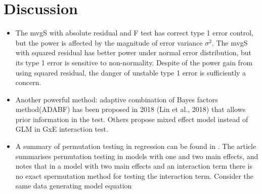 \documentclass{article}
\begin{document}
 

\newpage

\section{Discussion}

\begin{itemize}
	\item The mvgS with absolute residual and F test has correct type 1 error control, but the power is affected by the magnitude of error variance $\sigma^2$. The mvgS with squared residual has better power under normal error distribution, but its type 1 error is sensitive to non-normality. %
	Despite of the power gain from using squared residual, the danger of unstable type 1 error  is sufficiently a concern.
	
	\item Another powerful method: adaptive combination of Bayes factors method(ADABF) has been proposed in 2018 (Lin et al., 2018) that allows prior information in the test.  Others propose mixed effect model instead of GLM in GxE interaction test.


	\item A summary of permutation testing in regression can be found in \cite{anderson2001permutation}. The article summarises permutation testing in models with one and two main effects, and notes that in a model with two main effects and an interaction term there is no exact spermutation method for testing the interaction term. Consider the same data generating model equation
	

\end{itemize}
\end{document}
